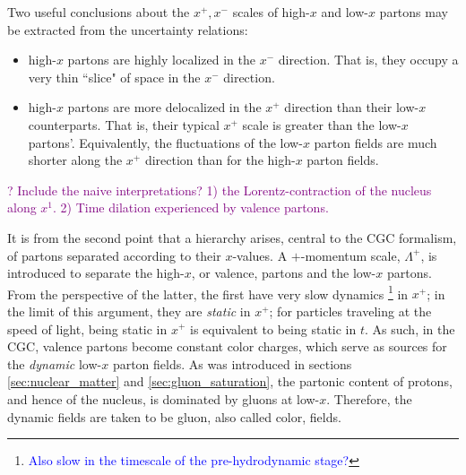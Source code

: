 Two useful conclusions about the $x^+,x^-$  scales of high-$x$ and low-$x$ partons may be extracted from the uncertainty relations:
\begin{itemize}
	\item[1)] high-$x$ partons are highly localized in the $x^-$ direction. That is, they occupy a very thin ``slice" of space in the $x^-$ direction.
	\item[2)] high-$x$ partons are more delocalized in the $x^+$ direction than their low-$x$ counterparts. That is, their typical $x^+$ scale %
		is greater than the low-$x$ partons'. Equivalently, the fluctuations of the low-$x$ parton fields are much shorter along the $x^+$ direction than for the high-$x$ parton fields.
\end{itemize}

\textcolor{purple}{? Include the naive \cite{Lappi_notes} interpretations? 1) the Lorentz-contraction of the nucleus along $x^1$. 2) Time dilation experienced by valence partons.}

It is from the second point that a hierarchy arises, central to the \gls{CGC} formalism, of partons separated according to their $x$-values. A $+$-momentum scale, $\Lambda^+$, is introduced to separate the high-$x$, or valence, partons and the low-$x$ partons. From the perspective of the latter, the first have very slow dynamics\textcolor{red}{ \footnote{\textcolor{blue}{Also slow in the timescale of the pre-hydrodynamic stage?}}} in $x^+$; in the limit of this argument, they are \emph{static} in $x^+$; for particles traveling at the speed of light, being static in $x^+$ is equivalent to being static in $t$. As such, in the \gls{CGC}, valence partons become constant color charges, which serve as sources for the \emph{dynamic} low-$x$ parton fields.
As was introduced in sections \ref{sec:nuclear_matter} and \ref{sec:gluon_saturation}, the partonic content of protons, and hence of the nucleus, is dominated by gluons at low-$x$. Therefore, the dynamic fields are taken to be gluon, also called color, fields.


